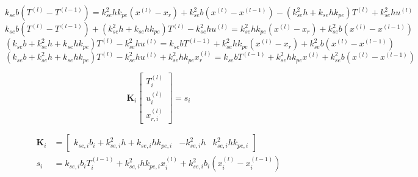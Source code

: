 \documentclass[a4paper,10pt]{article}
\begin{document}
\begin{equation}
k_{se} b (T^{(l)}-T^{(l-1)})
            = k_{se}^2 h k_{pe}(x^{(l)}-x_{r})
               + k_{se}^2 b (x^{(l)}-x^{(l-1)})
               -( k_{se}^2 h +k_{se} h k_{pe} ) T^{(l)}
               + k_{se}^2 h u^{(l)}
\end{equation}
\begin{equation}
k_{se} b  (T^{(l)}-T^{(l-1)}) + ( k_{se}^2 h +k_{se} h k_{pe} ) T^{(l)}
- k_{se}^2 h u^{(l)}
            = k_{se}^2 h k_{pe}(x^{(l)}-x_{r})
               + k_{se}^2 b (x^{(l)}-x^{(l-1)})
\end{equation}
\begin{equation}
(k_{se} b  + k_{se}^2 h +k_{se} h k_{pe} ) T^{(l)}
- k_{se}^2 h u^{(l)} =
k_{se} b T^{(l-1)}
            + k_{se}^2 h k_{pe}(x^{(l)}-x_{r})
               + k_{se}^2 b (x^{(l)}-x^{(l-1)})
\end{equation}
\begin{equation}
(k_{se} b  + k_{se}^2 h +k_{se} h k_{pe} ) T^{(l)}
- k_{se}^2 h u^{(l)} + k_{se}^2 h k_{pe} x^{(l)}_{r} =
k_{se} b T^{(l-1)}
            + k_{se}^2 h k_{pe} x^{(l)}
               + k_{se}^2 b (x^{(l)}-x^{(l-1)})
\end{equation}

\begin{equation}
\mathbf{K}_i
\left [
\begin{array}{c}
T^{(l)}_i \\ u^{(l)}_i \\ x_{r,i}^{(l)}
\end{array}
\right ] = s_i
\end{equation}

\begin{align}
\mathbf{K}_i & =
\left [
\begin{array}{ccc}
k_{se, i} b_i  + k_{se,i}^2 h +k_{se,i} h k_{pe,i}  &     - k_{se,i}^2 h  &  k_{se,i}^2 h k_{pe,i}
\end{array}
\right ]\\
s_i & = k_{se,i} b_i T^{(l-1)}_i
            + k_{se,i}^2 h k_{pe,i} x^{(l)}_i
               + k_{se,i}^2 b_i (x^{(l)}_i-x^{(l-1)}_i)
\end{align}
\end{document}
